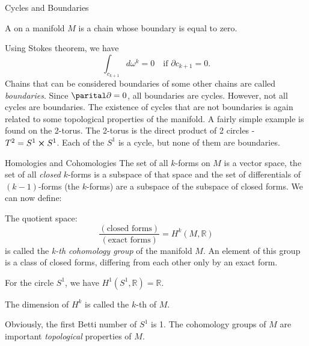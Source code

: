 \begin{subsubsection}{Cycles and Boundaries}
  \begin{definition}
    A  on a manifold $M$ is a chain whose boundary is equal to
    zero.
  \end{definition}
  Using Stokes theorem, we have
  \begin{equation}
    \int_{c_{k+1}}{d\omega^k} =0\quad \text{if } \partial c_{k+1} =0.
  \end{equation}
  Chains that can be considered boundaries of some other chains are called
  \textit{boundaries}. Since $\parital\partial = 0$, all boundaries are cycles.
  However, not all cycles are boundaries. The existence of cycles that are not
  boundaries is again related to some topological properties of the manifold.
  A fairly simple example is found on the 2-torus. The 2-torus is the direct
  product of 2 circles - $T^2=S^1\cross S^1$. Each of the $S^1$ is a cycle, but
  none of them are boundaries. 

  \begin{subsubsection}{Homologies and Cohomologies}
  The set of all $k$-forms on $M$ is a vector space, the set of all
  \textit{closed} $k$-forms is a subspace of that space and the set of
  differentials of $(k-1)$-forms (the  $k$-forms) are a subspace of
  the subspace of closed forms. We can now define:
  \begin{definition}
    The quotient space:
  \begin{equation}
    \frac{(\text{closed forms})}{(\text{exact forms})} = H^k(M,\mathbb{R})
  \end{equation}
    is called the \textit{k-th cohomology group} of the manifold $M$. An
    element of this group is a class of closed forms, differing from each other
    only by an exact form.
  \end{definition}
  For the circle $S^1$, we have $H^1(S^1,\mathbb{R}) = \mathbb{R}$.
  \begin{definition}
    The dimension of $H^k$ is called the $k$-th  of $M$.
  \end{definition}
  Obviously, the first Betti number of $S^1$ is 1. The cohomology groups of $M$ are important \textit{topological}
  properties of $M$.


\end{subsubsection}
\end{subsubsection}
